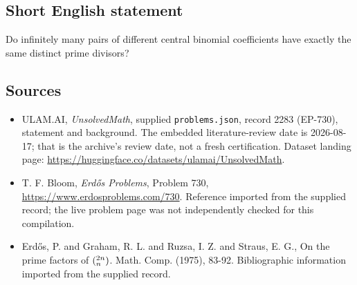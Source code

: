\documentclass[11pt,a4paper]{article}
\begin{document}
\subsection{Short English statement}

Do infinitely many pairs of different central binomial coefficients have exactly the same distinct prime divisors?

\subsection{Sources}

{\small

\begin{itemize}

\item[\hypertarget{source:2283:1}{S1}] ULAM.AI, \emph{UnsolvedMath}, supplied \texttt{problems.json}, record 2283 (EP-730), statement and background. The embedded literature-review date is 2026-08-17; that is the archive’s review date, not a fresh certification. Dataset landing page: \url{https://huggingface.co/datasets/ulamai/UnsolvedMath}.

\item[\hypertarget{source:2283:2}{S2}] T. F. Bloom, \emph{Erdős Problems}, Problem 730, \url{https://www.erdosproblems.com/730}. Reference imported from the supplied record; the live problem page was not independently checked for this compilation.

\item[\hypertarget{source:2283:3}{S3}] Erd\H{o}s, P. and Graham, R. L. and Ruzsa, I. Z. and Straus, E. G., On the prime factors of $(\sp{2n}\sb{n})$. Math. Comp. (1975), 83-92. Bibliographic information imported from the supplied record.

\end{itemize}

}

\label{end:2283}
\end{document}
